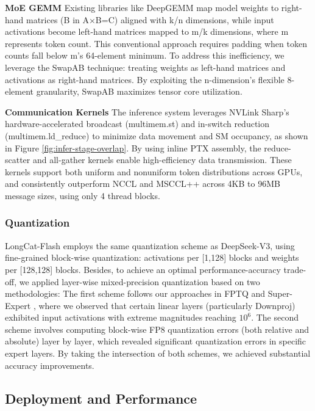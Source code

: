 \documentclass{article}
\newcommand{\longcat}{LongCat-Flash\xspace}
\begin{document}
\textbf{MoE GEMM} Existing libraries like DeepGEMM \citep{zhao2025deepgemm} map model weights to right-hand matrices (B in A×B=C) aligned with k/n dimensions, while input activations become left-hand matrices mapped to m/k dimensions, where m represents token count. This conventional approach requires padding when token counts fall below m's 64-element minimum. 
To address this inefficiency, we leverage the SwapAB \citep{dege2025flashmlaetapefficienttransposeattention} technique: treating weights as left-hand matrices and activations as right-hand matrices. By exploiting the n-dimension's flexible 8-element granularity, SwapAB maximizes tensor core utilization.

\textbf{Communication Kernels} The inference system leverages NVLink Sharp's hardware-accelerated broadcast (multimem.st) and in-switch reduction (multimem.ld\_reduce) to minimize data movement and SM occupancy, as shown in Figure \ref{fig:infer-stage-overlap}. 
By using inline PTX assembly, the reduce-scatter and all-gather kernels enable high-efficiency data transmission. These kernels support both uniform and nonuniform token distributions across GPUs, and consistently outperform NCCL \citep{nccl-2.21.5} and MSCCL++ \citep{shah2025mscclrethinkinggpucommunication} across 4KB to 96MB message sizes, using only 4 thread blocks.

\subsubsection{Quantization}

\longcat employs the same quantization scheme as DeepSeek-V3, using fine-grained block-wise quantization: activations per [1,128] blocks and weights per [128,128] blocks. Besides, to achieve an optimal performance-accuracy trade-off, we applied layer-wise mixed-precision quantization based on two methodologies: The first scheme follows our approaches in FPTQ \citep{li2023fptqfinegrainedposttrainingquantization} and Super-Expert \citep{su2025unveilingsuperexpertsmixtureofexperts}, where we observed that certain linear layers (particularly Downproj) exhibited input activations with extreme magnitudes reaching $10^6$. The second scheme involves computing block-wise FP8 quantization errors (both relative and absolute) layer by layer, which revealed significant quantization errors in specific expert layers. By taking the intersection of both schemes, we achieved substantial accuracy improvements.


\subsection{Deployment and Performance}
\end{document}
